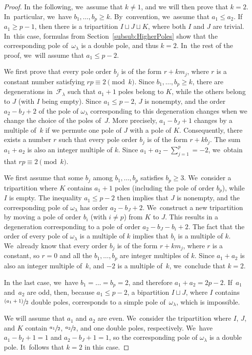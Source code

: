 \documentclass[11pt]{article}
\newcommand{\psfrac}[2]{\sfrac{(#1)}{#2}}
\theoremstyle{definition}
\begin{document}
\begin{proof}
In the following, we~assume that $k \neq 1$, and we will then prove that $k = 2$. In~particular, we~have $b_{1},\dots,b_{p} \geq k$. By~convention, we~assume that $a_{1} \leq a_{2}$. If~$a_{1} \geq p-1$, then there is a tripartition $I \sqcup J \sqcup K$, where both $I$ and $J$ are trivial. In~this case, formulas from Section~\ref{subsub:HigherPoles} show that the corresponding pole of~$\omega_{\lambda}$ is a double pole, and thus $k=2$. In~the rest of the proof, we~will assume that $a_{1} \leq p-2$.

We first prove that every pole order $b_{j}$ is of the form $r+km_{j}$, where $r$ is a constant number satisfying $rp \equiv 2\pmod{k}$. Since $b_{1},\dots,b_{p} \geq k$, there are degenerations in~$\mathcal{F}_{\lambda}$ such that $a_{1}+1$ poles belong to $K$, while the others belong to $J$ (with $I$ being empty). Since $a_{1} \leq p-2$, $J$ is nonempty, and the order $a_{2}-b_{J}+2$ of the pole of $\omega_{\lambda}$ corresponding to this degeneration changes when we change the choice of the poles of~$J$. More precisely, $a_{1}-b_{J}+1$ changes by a multiple of~$k$ if we permute one pole of $J$ with a pole of $K$. Consequently, there exists a number $r$ such that every pole order $b_{j}$ is of the form $r+kb_{j}$. The sum $a_{1}+a_{2}$ is also an integer multiple of $k$. Since $a_{1}+a_{2} - \sum_{j=1}^{p}=-2$, we~obtain that $rp \equiv 2 \pmod{k}$.

We first assume that some $b_{j}$ among $b_{1},\dots,b_{p}$ satisfies $b_{p} \geq 3$. We~consider a tripartition where $K$ contains $a_{1}+1$ poles (including the pole of order $b_{p}$), while~$I$ is empty. The inequality $a_{1} \leq p-2$ then implies that $J$ is nonempty, and the corresponding pole of $\omega_{\lambda}$ has order $a_{2}-b_{J}+2$. We~construct a new tripartition by moving a pole of order $b_{i}$ (with $i \neq p$) from $K$ to $J$. This results in a degeneration corresponding to a pole of order $a_{2}-b_{J}-b_{i}+2$. The fact that the order of every pole of $\omega_{\lambda}$ is a multiple of $k$ implies that $b_{i}$ is a multiple of $k$. We~already know that every order $b_{j}$ is of the form $r+km_{j}$, where $r$ is a constant, so $r=0$ and all the $b_{1},\dots,b_{p}$ are integer multiples of $k$. Since $a_{1}+a_{2}$ is also an integer multiple of~$k$, and $-2$ is a multiple of~$k$, we~conclude that $k=2$.

In the last case, we~have $b_{1}=\dots=b_{p}=2$, and therefore $a_{1}+a_{2}=2p-2$. If~$a_{1}$ and~$a_{2}$ are odd, then, because $a_{1} \leq p-2$, a bipartition $I \sqcup J$, where $I$ contains $\psfrac{a_{1}+1}{2}$ double poles, corresponds to a simple pole of~$\omega_{\lambda}$, which is impossible.

We will assume that $a_{1}$ and $a_{2}$ are even. We~consider the tripartition where $I$, $J$, and $K$ contain $\sfrac{a_{1}}{2}$, $\sfrac{a_{2}}{2}$, and one double poles, respectively. We~have $a_{1}-b_{I}+1=1$ and $a_{2}-b_{J}+1=1$, so the corresponding pole of $\omega_{\lambda}$ is a double pole. It~follows that $k=2$ in this case.
\end{proof}
\end{document}
